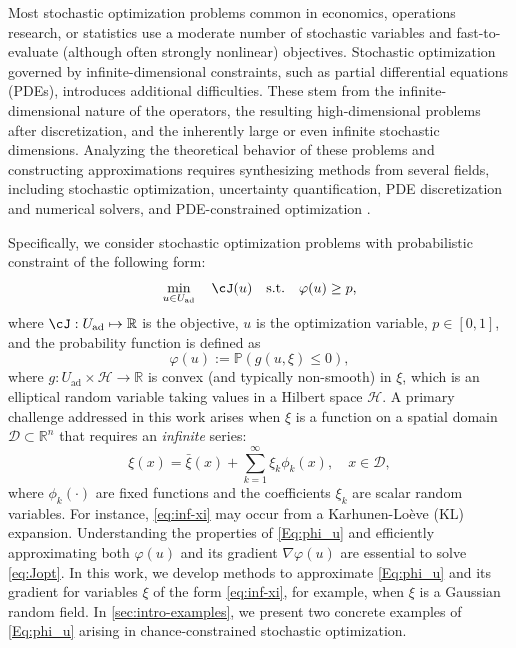 \documentclass[%
onefignum,onetabnum]{siamonline250211}
\newcommand{\bbP}{\mathbb P}
\newcommand{\bbR}{\mathbb R}
\newcommand{\D}{{\mathcal D}}
\begin{document}
Most stochastic optimization problems common in economics, operations research, or statistics use a moderate number of stochastic variables and fast-to-evaluate (although often strongly nonlinear) objectives. Stochastic optimization governed by infinite-dimensional constraints, such as partial differential equations (PDEs), introduces additional difficulties. These stem from the infinite-dimensional nature of the operators, the resulting high-dimensional problems after discretization, and the inherently large or even infinite stochastic dimensions.
Analyzing the theoretical behavior of these problems and constructing approximations requires synthesizing methods from several fields, including stochastic optimization, uncertainty quantification, PDE discretization and numerical solvers, and PDE-constrained optimization \cite{HeKo-Acta25}.


Specifically, we consider stochastic optimization problems with probabilistic constraint of the following form:
\begin{equation}\label{eq:Jopt}
        \min_{u\in U_{\mathrm{ad}}} \quad  \cJ(u) \quad 
        \mathrm{s.t.} \quad   \varphi(u)\geq p,
\end{equation}
where $\cJ:U_{\text{ad}}\mapsto \bbR$ is the objective, $u$ is the optimization variable, $p\in [0,1]$, and the probability function is defined as
\begin{equation}\label{Eq:phi_u}
    \varphi(u):=\bbP(g(u,{\xi})\leq 0),
\end{equation}
where $g:U_\text{ad}\times \mathscr{H}\to \mathbb{R}$ is convex (and typically non-smooth) in $\xi$, which is an elliptical random variable taking values in a Hilbert space $\mathscr H$. A primary challenge addressed in this work arises when $\xi$ is a function on a spatial domain $\D\subset \mathbb R^n$ that requires an \emph{infinite} series:
\begin{equation}\label{eq:inf-xi}
\xi(x) = \bar\xi(x) + \sum_{k=1}^\infty \xi_k \phi_k(x), \quad x\in \D, 
\end{equation}
where $\phi_k(\cdot)$ are fixed functions and the coefficients $\xi_k$ are scalar random variables. For instance, \eqref{eq:inf-xi} may occur from a Karhunen-Lo\`eve (KL) expansion. Understanding the properties of \eqref{Eq:phi_u} and efficiently approximating both $\varphi(u)$ and its gradient $\nabla \varphi(u)$ are essential to solve \eqref{eq:Jopt}. In this work, we develop methods to approximate \eqref{Eq:phi_u} and its gradient for variables $\xi$ of the form \eqref{eq:inf-xi}, for example, when $\xi$ is a Gaussian random field. In \cref{sec:intro-examples}, we present two concrete examples of \eqref{Eq:phi_u} arising in chance-constrained stochastic optimization.
\end{document}
